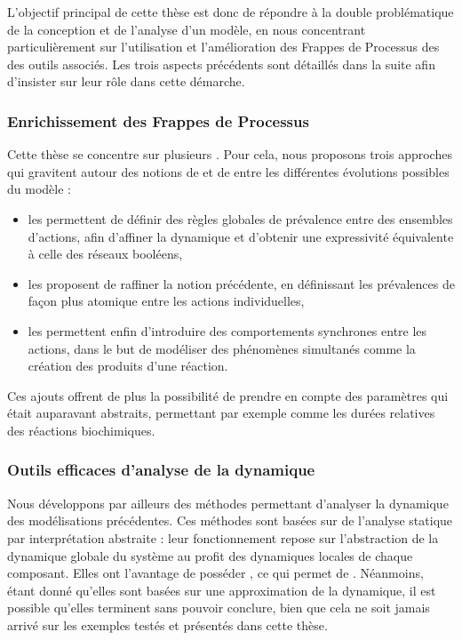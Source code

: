 L'objectif principal de cette thèse est donc de répondre à la double problématique
de la conception et de l'analyse d'un modèle,
en nous concentrant particulièrement sur l'utilisation et l'amélioration
des Frappes de Processus des des outils associés.
Les trois aspects précédents sont détaillés dans la suite
afin d'insister sur leur rôle dans cette démarche.

\subsubsection{Enrichissement des Frappes de Processus}

Cette thèse se concentre sur plusieurs .
Pour cela, nous proposons trois approches qui gravitent autour des notions
de  et de  entre les différentes
évolutions possibles du modèle :
\begin{itemize}
  \item les  permettent de définir des règles globales de prévalence
    entre des ensembles d'actions, afin d'affiner la dynamique et d'obtenir une expressivité
    équivalente à celle des réseaux booléens,
  \item les  proposent de raffiner la notion précédente,
    en définissant les prévalences de façon plus atomique entre les actions individuelles,
  \item les  permettent enfin d'introduire des comportements
    synchrones entre les actions, dans le but de modéliser des phénomènes simultanés
    comme la création des produits d'une réaction.
\end{itemize}
Ces ajouts offrent de plus la possibilité de prendre en compte des paramètres qui était
auparavant abstraits,
permettant par exemple 
comme les durées relatives des réactions biochimiques.

\subsubsection{Outils efficaces d'analyse de la dynamique}

Nous développons par ailleurs des méthodes permettant d'analyser la dynamique
des modélisations précédentes.
Ces méthodes sont basées sur de l'analyse statique par interprétation abstraite :
leur fonctionnement repose sur l'abstraction de la dynamique globale du système
au profit des dynamiques locales de chaque composant.
Elles ont l'avantage de posséder ,
ce qui permet de .
Néanmoins, étant donné qu'elles sont basées sur une approximation de la dynamique,
il est possible qu'elles terminent sans pouvoir conclure,
bien que cela ne soit jamais arrivé sur les exemples testés et présentés dans cette thèse.

